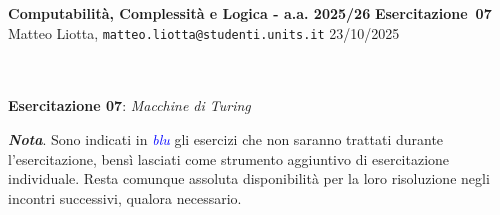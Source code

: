 \documentclass[a4paper,10pt]{article}
\makeatletter
\newcommand{\EsercitazioneNum}{07}
\newcommand{\Data}{23/10/2025}
\newcommand{\DocType}{Esercitazione} %
\newcommand{\FullTitle}{\DocType\ \EsercitazioneNum}
\newcommand{\Header}{
\noindent
  \small \textbf{Computabilità, Complessità e Logica - a.a. 2025/26} \hfill \textbf{\FullTitle} \\[0.2cm]
  \scriptsize Matteo Liotta, \texttt{matteo.liotta@studenti.units.it} \hfill \Data \\[0.2cm]
  \noindent\makebox[\linewidth]{\rule{\linewidth}{0.4pt}} \\[0.3cm]}
\makeatother
\begin{document}
\footnotesize  %
\Header\\[0.7cm]





\noindent\Large \textbf{Esercitazione 07}: \textit{Macchine di Turing}
\begin{osservazioni}
    \textbf{\textit{Nota}}. Sono indicati in \textcolor{blue}{\textit{blu}} gli esercizi che non saranno trattati durante l'esercitazione, bensì lasciati come strumento aggiuntivo di esercitazione individuale. Resta comunque assoluta disponibilità per la loro risoluzione negli incontri successivi, qualora necessario.
\end{osservazioni}
\end{document}
